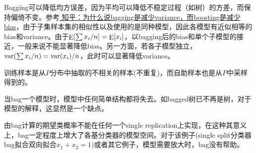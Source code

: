             Bagging可以降低均方误差，因为平均可以降低不稳定过程（如树）的方差，而保持偏倚不变。参考\href{https://www.zhihu.com/question/26760839}{\color{blue} 知乎：为什么说bagging是减少variance，而boosting是减少bias}，由于子集样本集的相似性以及使用的是同种模型，因此各模型有近似相等的bias和variance。由于${\mathop{\rm E}\nolimits} [{{\sum {{x_i}} } \mathord{\left/
 {\vphantom {{\sum {{x_i}} } n}} \right.
 \kern-\nulldelimiterspace} n}] = {\mathop{\rm E}\nolimits} [{x_i}]$，以bagging后的bias和单个子模型的接近，一般来说不能显著降低bias。另一方面，若各子模型独立，${\mathop{\rm var}} ({{\sum {{x_i}} } \mathord{\left/
 {\vphantom {{\sum {{x_i}} } n}} \right.
 \kern-\nulldelimiterspace} n}) = {{{\mathop{\rm var}} ({x_i})} \mathord{\left/
 {\vphantom {{{\mathop{\rm var}} ({x_i})} n}} \right.
 \kern-\nulldelimiterspace} n}$，此时可以显著降低variance。
            
            训练样本是从$P$分布中抽取的不相关的样本(不重复)，而自助样本也是从$P$中采样得到的。
            
            
            当bag一个模型时，模型中任何简单结构都将失去。如bagged树已不再是树，对于模型的解释，这显然是一个缺点。
            
            由bag计算的期望类概率不能在任何一个single replication上实现，在这种其意义上，bag一定程度上增大了各基分类器的模型空间。对于该例子(single split分类器bag拟合双向拟合$x_1+x_2=1$)或者其它例子，模型需要放大时，bag没有帮助。



